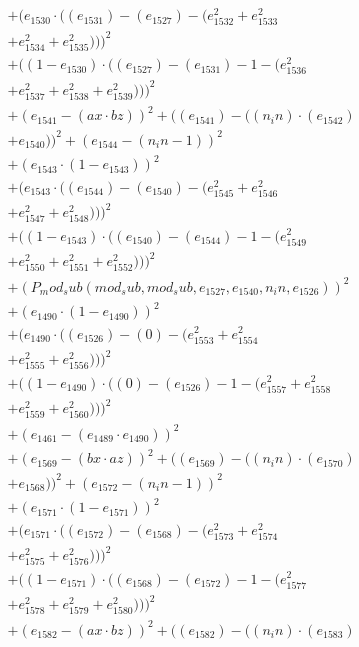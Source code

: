 \documentclass[10pt, a4paper]{article}
\begin{document}
\begin{align*}
& + (e_{1530}  \cdot  ((e_{1531}) - (e_{1527}) - (e_{1532}^{2} + e_{1533}^{2} \\
& + e_{1534}^{2} + e_{1535}^{2})))^{2} \\
& + ((1 - e_{1530})  \cdot  ((e_{1527}) - (e_{1531}) - 1 - (e_{1536}^{2} \\
& + e_{1537}^{2} + e_{1538}^{2} + e_{1539}^{2})))^{2} \\
& + (e_{1541} - (ax  \cdot  bz))^{2} + ((e_{1541}) - ((n_in)  \cdot  (e_{1542}) \\
& + e_{1540}))^{2} + (e_{1544} - (n_in - 1))^{2} \\
& + (e_{1543}  \cdot  (1 - e_{1543}))^{2} \\
& + (e_{1543}  \cdot  ((e_{1544}) - (e_{1540}) - (e_{1545}^{2} + e_{1546}^{2} \\
& + e_{1547}^{2} + e_{1548}^{2})))^{2} \\
& + ((1 - e_{1543})  \cdot  ((e_{1540}) - (e_{1544}) - 1 - (e_{1549}^{2} \\
& + e_{1550}^{2} + e_{1551}^{2} + e_{1552}^{2})))^{2} \\
& + (P_mod_sub(mod_sub, mod_sub, e_{1527}, e_{1540}, n_in, e_{1526}))^{2} \\
& + (e_{1490}  \cdot  (1 - e_{1490}))^{2} \\
& + (e_{1490}  \cdot  ((e_{1526}) - (0) - (e_{1553}^{2} + e_{1554}^{2} \\
& + e_{1555}^{2} + e_{1556}^{2})))^{2} \\
& + ((1 - e_{1490})  \cdot  ((0) - (e_{1526}) - 1 - (e_{1557}^{2} + e_{1558}^{2} \\
& + e_{1559}^{2} + e_{1560}^{2})))^{2} \\
& + (e_{1461} - (e_{1489}  \cdot  e_{1490}))^{2} \\
& + (e_{1569} - (bx  \cdot  az))^{2} + ((e_{1569}) - ((n_in)  \cdot  (e_{1570}) \\
& + e_{1568}))^{2} + (e_{1572} - (n_in - 1))^{2} \\
& + (e_{1571}  \cdot  (1 - e_{1571}))^{2} \\
& + (e_{1571}  \cdot  ((e_{1572}) - (e_{1568}) - (e_{1573}^{2} + e_{1574}^{2} \\
& + e_{1575}^{2} + e_{1576}^{2})))^{2} \\
& + ((1 - e_{1571})  \cdot  ((e_{1568}) - (e_{1572}) - 1 - (e_{1577}^{2} \\
& + e_{1578}^{2} + e_{1579}^{2} + e_{1580}^{2})))^{2} \\
& + (e_{1582} - (ax  \cdot  bz))^{2} + ((e_{1582}) - ((n_in)  \cdot  (e_{1583}) \\

\end{align*}
\end{document}

